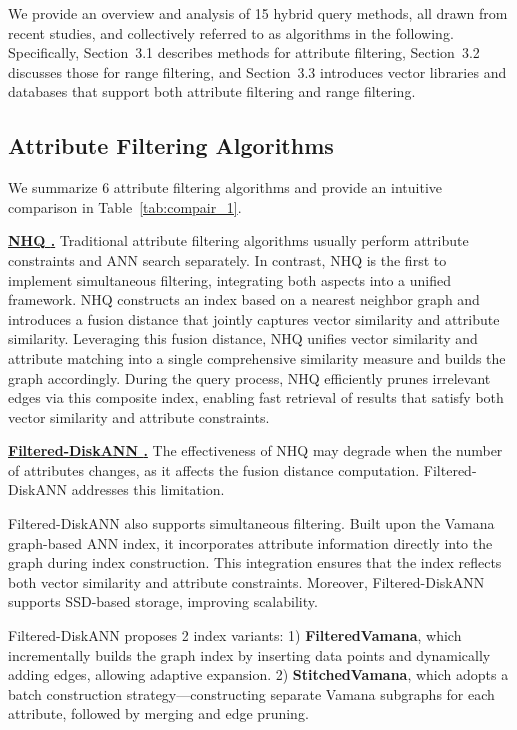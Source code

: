 \documentclass[sigconf, nonacm]{acmart}
\begin{document}
	
	We provide an overview and analysis of 15 hybrid query methods, all drawn from recent studies, and collectively referred to as algorithms in the following. Specifically, Section~3.1 describes methods for attribute filtering, Section~3.2 discusses those for range filtering, and Section~3.3 introduces vector libraries and databases that support both attribute filtering and range filtering.
	
	
	\subsection{Attribute Filtering Algorithms}
	
	We summarize 6 attribute filtering algorithms and provide an intuitive comparison in Table~\ref{tab:compair_1}.
	
	\noindent\textbf{\underline{NHQ \cite{NHQ}.}}  
	Traditional attribute filtering algorithms usually perform attribute constraints and ANN search separately. In contrast, NHQ is the first to implement simultaneous filtering, integrating both aspects into a unified framework. NHQ constructs an index based on a nearest neighbor graph and introduces a fusion distance that jointly captures vector similarity and attribute similarity. Leveraging this fusion distance, NHQ unifies vector similarity and attribute matching into a single comprehensive similarity measure and builds the graph accordingly. During the query process, NHQ efficiently prunes irrelevant edges via this composite index, enabling fast retrieval of results that satisfy both vector similarity and attribute constraints.
	
	
	\noindent\textbf{\underline{Filtered-DiskANN \cite{Filtered-diskann}.}}  
	The effectiveness of NHQ may degrade when the number of attributes changes, as it affects the fusion distance computation. Filtered-DiskANN addresses this limitation.
	
	Filtered-DiskANN also supports simultaneous filtering. Built upon the Vamana \cite{diskann} graph-based ANN index, it incorporates attribute information directly into the graph during index construction. This integration ensures that the index reflects both vector similarity and attribute constraints. Moreover, Filtered-DiskANN supports SSD-based storage, improving scalability.
	
	Filtered-DiskANN proposes 2 index variants:  
	1) \textbf{FilteredVamana}, which incrementally builds the graph index by inserting data points and dynamically adding edges, allowing adaptive expansion.  
	2) \textbf{StitchedVamana}, which adopts a batch construction strategy—constructing separate Vamana subgraphs for each attribute, followed by merging and edge pruning.
	
\end{document}
